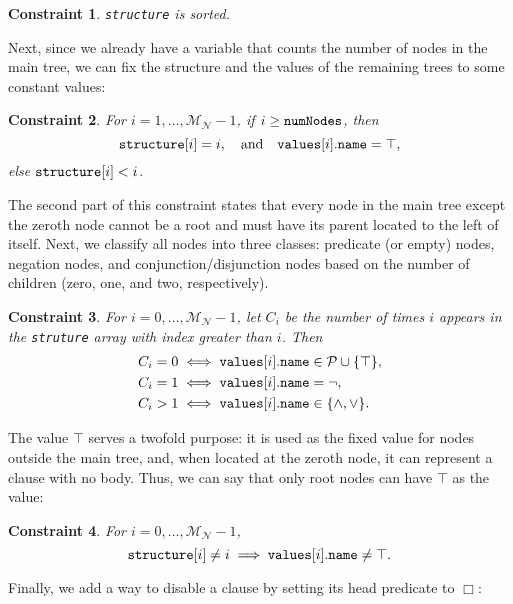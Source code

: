 \documentclass[letterpaper]{article}
\newtheorem{constraint}{Constraint}
\theoremstyle{definition}
\newcommand{\variable}[1]{\texttt{\textup{#1}}}
\newcommand{\predicates}{\mathcal{P}}
\newcommand{\maxNumNodes}{\mathcal{M}_{\mathcal{N}}}
\begin{document}
\begin{constraint}
  \variable{structure} is sorted.
\end{constraint}

Next, since we already have a variable that counts the number of nodes in the
main tree, we can fix the structure and the values of the remaining trees to
some constant values:

\begin{constraint}
  For $i = 1, \dots, \maxNumNodes{} - 1$, if $i \ge \variable{numNodes}$, then
  \[
    \variable{structure}[i] = i, \quad \text{and} \quad
    \variable{values}[i].\variable{name} = \top,
  \]
  else $\variable{structure}[i] < i$.
\end{constraint}

The second part of this constraint states that every node in the main tree
except the zeroth node cannot be a root and must have its parent located to
the left of itself. Next, we classify all nodes into three classes: predicate
(or empty) nodes, negation nodes, and conjunction/disjunction nodes based on the
number of children (zero, one, and two, respectively).

\begin{constraint} \label{constraint:node_types}
  For $i = 0, \dots, \maxNumNodes{} - 1$, let $C_i$ be the number of times $i$
  appears in the \variable{struture} array with index greater than $i$. Then
  \begin{align*}
    C_i = 0 &\iff \variable{values}[i].\variable{name} \in \predicates{} \cup \{ \top \},\\
    C_i = 1 &\iff \variable{values}[i].\variable{name} = \neg,\\
    C_i > 1 &\iff \variable{values}[i].\variable{name} \in \{ \land, \lor \}.
  \end{align*}
\end{constraint}

The value $\top$ serves a twofold purpose: it is used as the fixed value for
nodes outside the main tree, and, when located at the zeroth node, it can
represent a clause with no body. Thus, we can say that only root nodes can have
$\top$ as the value:

\begin{constraint}
  For $i = 0, \dots, \maxNumNodes{} - 1$,
  \[
    \variable{structure}[i] \ne i \implies
    \variable{values}[i].\variable{name} \ne \top.
  \]
\end{constraint}

Finally, we add a way to disable a clause by setting its head predicate to
$\Box$:
\end{document}

